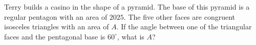 Terry builds a casino in the shape of a pyramid. The base of this pyramid is a regular pentagon with an area of $2025$. The five other faces are congruent isosceles triangles with an area of $A$. If the angle between one of the triangular faces and the pentagonal base is $60^\circ$, what is $A$?
